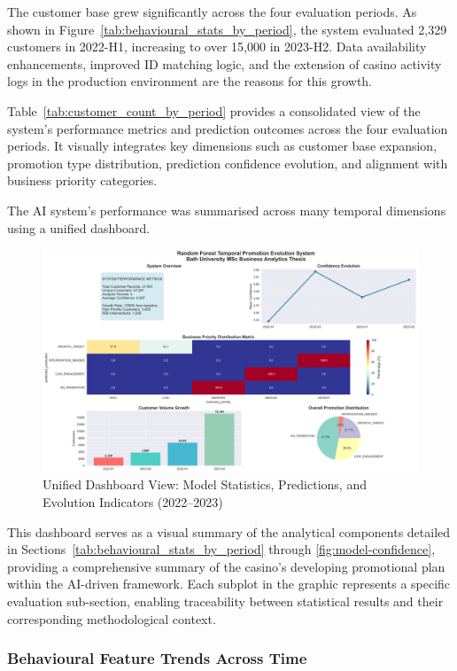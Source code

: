 \documentclass[12pt,a4paper]{report}
\begin{document}
The customer base grew significantly across the four evaluation periods. As shown in Figure~\ref{tab:behavioural_stats_by_period}, the system evaluated 2,329 customers in 2022-H1, increasing to over 15,000 in 2023-H2. Data availability enhancements, improved ID matching logic, and the extension of casino activity logs in the production environment are the reasons for this growth.

\noindent
Table~\ref{tab:customer_count_by_period} provides a consolidated view of the system’s performance metrics and prediction outcomes across the four evaluation periods. It visually integrates key dimensions such as customer base expansion, promotion type distribution, prediction confidence evolution, and alignment with business priority categories. 

The AI system's performance was summarised across many temporal dimensions using a unified dashboard.

\begin{figure}[H]
\centering
\includegraphics[width=1.03\textwidth]{figures/summary_dashboard.png}
\caption{Unified Dashboard View: Model Statistics, Predictions, and Evolution Indicators (2022--2023)}
\label{fig:unified-summary-dashboard}
\end{figure}

This dashboard serves as a visual summary of the analytical components detailed in Sections~\ref{tab:behavioural_stats_by_period} through \ref{fig:model-confidence}, providing a comprehensive summary of the casino's developing promotional plan within the AI-driven framework. Each subplot in the graphic represents a specific evaluation sub-section, enabling traceability between statistical results and their corresponding methodological context.


\subsubsection*{Behavioural Feature Trends Across Time}
\end{document}
